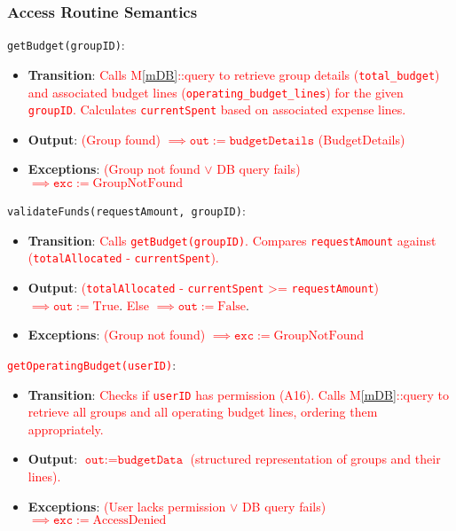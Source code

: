 \documentclass[12pt, titlepage]{article}
\providecommand{\mref}[1]{M\ref{#1}}
\begin{document}
\subsubsection{Access Routine Semantics}
\noindent \texttt{getBudget(groupID)}:
\begin{itemize}
    \item \textbf{Transition}: \textcolor{red}{Calls \mref{mDB}::query to retrieve group details (\texttt{total\_budget}) and associated budget lines (\texttt{operating\_budget\_lines}) for the given \texttt{groupID}.} \textcolor{red}{Calculates \texttt{currentSpent} based on associated expense lines.}
    \item \textbf{Output}: \textcolor{red}{(Group found) $\implies \texttt{out} := \texttt{budgetDetails}$ (BudgetDetails)}
    \item \textbf{Exceptions}: \textcolor{red}{(Group not found $\lor$ DB query fails) $\implies \texttt{exc} := \text{GroupNotFound}$}
\end{itemize}

\noindent \texttt{validateFunds(requestAmount, groupID)}:
\begin{itemize}
    \item \textbf{Transition}: \textcolor{red}{Calls \texttt{getBudget(groupID)}. Compares \texttt{requestAmount} against (\texttt{totalAllocated} - \texttt{currentSpent}).}
    \item \textbf{Output}: \textcolor{red}{(\texttt{totalAllocated} - \texttt{currentSpent} >= \texttt{requestAmount}) $\implies \texttt{out} := \text{True}$}. \textcolor{red}{Else $\implies \texttt{out} := \text{False}$}.
    \item \textbf{Exceptions}: \textcolor{red}{(Group not found) $\implies \texttt{exc} := \text{GroupNotFound}$}
\end{itemize}

\noindent \textcolor{red}{\texttt{getOperatingBudget(userID)}}:
\begin{itemize}
    \item \textbf{Transition}: \textcolor{red}{Checks if \texttt{userID} has permission (A16). Calls \mref{mDB}::query to retrieve all groups and all operating budget lines, ordering them appropriately.}
    \item \textbf{Output}: \textcolor{red}{$\texttt{out} := \texttt{budgetData}$ (structured representation of groups and their lines).}
    \item \textbf{Exceptions}: \textcolor{red}{(User lacks permission $\lor$ DB query fails) $\implies \texttt{exc} := \text{AccessDenied}$}
\end{itemize}
\end{document}
